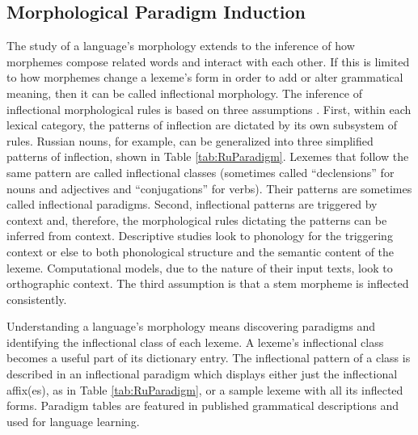 \documentclass[12pt]{article}
\begin{document}
\subsection{Morphological Paradigm Induction}
\label{paradigms}

The study of a language's morphology extends to the inference of how morphemes compose related words and interact with each other. If this is limited to how morphemes change a lexeme's form in order to add or alter grammatical meaning, then it can be called inflectional morphology. The inference of inflectional morphological rules is based on three assumptions \cite{durrett_supervised_2013}. First, within each lexical category, the patterns of inflection are dictated by its own subsystem of rules. Russian nouns, for example, can be generalized into three simplified patterns of inflection, shown in Table \ref{tab:RuParadigm}. Lexemes that follow the same pattern are called inflectional classes (sometimes called ``declensions'' for nouns and adjectives and ``conjugations'' for verbs). Their patterns are sometimes called inflectional paradigms. Second, inflectional patterns are triggered by context and, therefore, the morphological rules dictating the patterns can be inferred from context. Descriptive studies look to phonology for the triggering context or else to both phonological structure and the semantic content of the lexeme. Computational models, due to the nature of their input texts, look to orthographic context. The third assumption is that a stem morpheme is inflected consistently. 

Understanding a language's morphology means discovering paradigms and identifying the inflectional class of each lexeme. A lexeme's inflectional class becomes a useful part of its dictionary entry. The inflectional pattern of a class is described in an inflectional paradigm which displays either just the inflectional affix(es), as in Table \ref{tab:RuParadigm}, or a sample lexeme with all its inflected forms. Paradigm tables are featured in published grammatical descriptions and used for language learning. 
\end{document}
